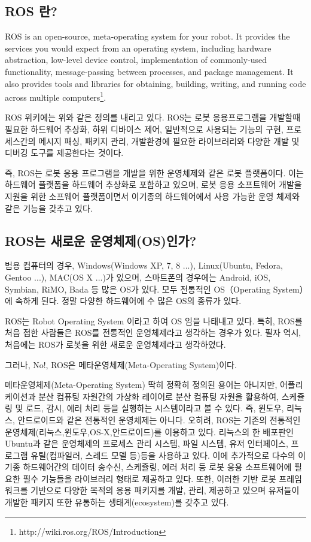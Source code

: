 \subsection{ROS 란?}

ROS is an open-source, meta-operating system for your robot.
It provides the services you would expect from an operating system, including hardware abstraction, low-level device control, implementation of commonly-used functionality, message-passing between processes, and package management.
It also provides tools and libraries for obtaining, building, writing, and running code across multiple computers\footnote{http://wiki.ros.org/ROS/Introduction}.

ROS 위키에는 위와 같은 정의를 내리고 있다. ROS는 로봇 응용프로그램을 개발할때 필요한 하드웨어 추상화, 하위 디바이스 제어, 일반적으로 사용되는 기능의 구현, 프로세스간의 메시지 패싱, 패키지 관리, 개발환경에 필요한 라이브러리와 다양한 개발 및 디버깅 도구를 제공한다는 것이다. 

즉, ROS는 로봇 응용 프로그램을 개발을 위한 운영체제와 같은 로봇 플랫폼이다.
이는 하드웨어 플랫폼을 하드웨어 추상화로 포함하고 있으며, 로봇 응용 소프트웨어 개발을 지원을 위한 소프웨어 플랫폼이면서 이기종의 하드웨어에서 사용 가능한 운영 체제와 같은 기능을 갖추고 있다.

\subsection{ROS는 새로운 운영체제(OS)인가?}

범용 컴퓨터의 경우, Windows(Windows XP, 7, 8 ...), Linux(Ubuntu, Fedora, Gentoo ...), MAC(OS X ...)가 있으며, 스마트폰의 경우에는 Android, iOS, Symbian, RiMO, Bada 등 많은 OS가 있다.
모두 전통적인 OS（Operating System）에 속하게 된다.
정말 다양한 하드웨어에 수 많은 OS의 종류가 있다. 

ROS는 Robot Operating System 이라고 하여 OS 임을 나태내고 있다.
특히, ROS를 처음 접한 사람들은 ROS를 전통적인 운영체제라고 생각하는 경우가 있다.
필자 역시, 처음에는 ROS가 로봇을 위한 새로운 운영체제라고 생각하였다. 

그러나, No!, ROS은 메타운영체제(Meta-Operating System)이다.

메타운영체제(Meta-Operating System) 딱히 정확히 정의된 용어는 아니지만, 어플리케이션과 분산 컴퓨팅 자원간의 가상화 레이어로 분산 컴퓨팅 자원을 활용하여, 스케쥴링 및 로드, 감시, 에러 처리 등을 실행하는 시스템이라고 볼 수 있다.
즉, 윈도우, 리눅스, 안드로이드와 같은 전통적인 운영체제는 아니다.
오히려, ROS는 기존의 전통적인 운영체제(리눅스,윈도우,OS-X,안드로이드)를 이용하고 있다.
리눅스의 한 배포판인 Ubuntu과 같은 운영체제의 프로세스 관리 시스템, 파일 시스템, 유저 인터페이스, 프로그램 유틸(컴파일러, 스레드 모델 등)등을 사용하고 있다.
이에 추가적으로 다수의 이기종 하드웨어간의 데이터 송수신, 스케쥴링, 에러 처리 등 로봇 응용 소프트웨어에 필요한 필수 기능들을 라이브러리 형태로 제공하고 있다.
또한, 이러한 기반 로봇 프레임워크를 기반으로 다양한 목적의 응용 패키지를 개발, 관리, 제공하고 있으며 유저들이 개발한 패키지 또한 유통하는 생태계(ecosystem)를 갖추고 있다.

